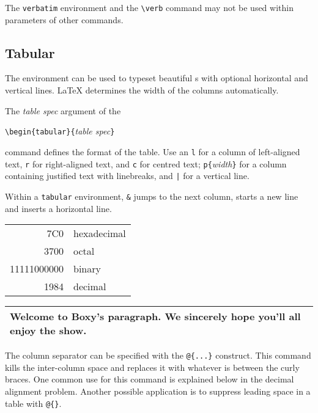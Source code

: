 The \texttt{verbatim} environment and the \verb|\verb| command may not be used
within parameters of other commands.


\subsection{Tabular}

The  environment can be used to typeset beautiful
s with optional horizontal and vertical lines. \LaTeX{}
determines the width of the columns automatically.

The \emph{table spec} argument of the 
\begin{command}
\verb|\begin{tabular}{|\emph{table spec}\verb|}|
\end{command} 
\noindent command defines the format of the table. Use an \texttt{l} for a column of
left-aligned text, \texttt{r} for right-aligned text, and \texttt{c} for
centred text; \verb|p{|\emph{width}\verb|}| for a column containing justified
text with linebreaks, and \verb.|. for a vertical line.
 
Within a \texttt{tabular} environment, \verb|&| jumps to the next column, \ci{\bs}
starts a new line and  inserts a horizontal line.

\begin{example}
\begin{tabular}{|r|l|}
\hline
7C0 & hexadecimal \\
3700 & octal \\
11111000000 & binary \\
\hline \hline
1984 & decimal \\
\hline
\end{tabular}
\end{example}

\begin{example}
\begin{tabular}{|p{4.7cm}|}
\hline
Welcome to Boxy's paragraph.
We sincerely hope you'll 
all enjoy the show.\\
\hline 
\end{tabular}
\end{example}

The column separator can be specified with the \verb|@{...}|
construct. This command kills the inter-column space and replaces it
with whatever is between the curly braces.  One common use for
this command is explained below in the decimal alignment problem.
Another possible application is to suppress leading space in a table with
\verb|@{}|.

